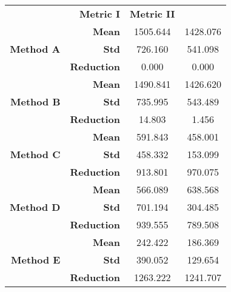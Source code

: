 \begin{tabular}{rrcc}
\addlinespace
\toprule
\multicolumn{ 2}{c}{{\bf Condition}} & {\bf Metric I} & {\bf Metric II} \\
\otoprule
{\bf } & {\bf Mean} & 1505.644 & 1428.076 \\
{\bf Method A} & {\bf Std} & 726.160 & 541.098 \\
{\bf } & {\bf Reduction} & 0.000 & 0.000 \\
\midrule
{\bf } & {\bf Mean} & 1490.841 & 1426.620 \\
{\bf Method B} & {\bf Std} & 735.995 & 543.489 \\
{\bf } & {\bf Reduction} & 14.803 & 1.456 \\
\midrule
{\bf } & {\bf Mean} & 591.843 & 458.001 \\
{\bf Method C} & {\bf Std} & 458.332 & 153.099 \\
{\bf } & {\bf Reduction} & 913.801 & 970.075 \\
\midrule
{\bf } & {\bf Mean} & 566.089 & 638.568 \\
{\bf Method D} & {\bf Std} & 701.194 & 304.485 \\
{\bf } & {\bf Reduction} & 939.555 & 789.508 \\
\midrule
{\bf } & {\bf Mean} & 242.422 & 186.369 \\
{\bf Method E} & {\bf Std} & 390.052 & 129.654 \\
      & {\bf Reduction} & 1263.222 & 1241.707 \\
\midrule
\end{tabular}

